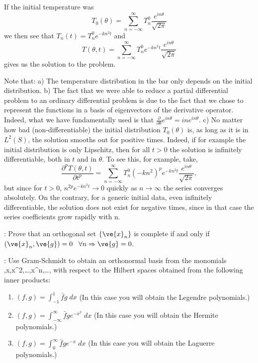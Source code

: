 If the initial temperature was 
\begin{equation}
  T_0(\theta) = \sum^{\infty}_{n=-\infty} T_n^0 \frac{e^{in\theta}}{\sqrt{2\pi}}
\end{equation}
%
we then see that $T_n(t) = T_n^0 e^{-kn^2t}$ and
\begin{equation}
  \label{eq:T_fourier_solucion}
  T(\theta,t) = \sum^{\infty}_{n=-\infty} T_n^0 e^{-kn^2t} \frac{e^{in\theta}}{\sqrt{2\pi}}
\end{equation}
%
gives us the solution to the problem.

Note that: 
a) The temperature distribution in the bar only depends on
the initial distribution. 
%
b) The fact that we were able to reduce a partial differential problem to an ordinary differential problem is due to the fact that we chose to represent the functions in a basis of eigenvectors of the derivative operator. Indeed, what
we have fundamentally used is that 
$\frac{\partial}{\partial \theta} e^{in\theta} = in e^{in\theta}$.
%
c) No matter how bad (non-differentiable) the 
initial distribution $T_0(\theta)$ is, as long as it is in $L^2(S)$, the solution smooths out for positive times. Indeed, if for example the initial distribution is only Lipschitz, then for all $t > 0$ the solution 
is infinitely differentiable, both in $t$ and in $\theta$. 
To see this, for example, take,
\begin{equation}
   \frac{\partial^pT(\theta,t)}{\partial t^p}  
   = \sum^{\infty}_{n=-\infty} T_n^0 (-kn^2)^p e^{-kn^2t} \frac{e^{in\theta}}{\sqrt{2\pi}},
\end{equation}
%
but since for $t>0$, $n^{2p} e^{-kn^2t} \to 0$ quickly as $n \to \infty$ the series converges absolutely. On the contrary, for a generic initial data, even infinitely differentiable, the solution does not exist for negative times, since in that case the series coefficients grow rapidly
with n. 


\ejer: Prove that an orthogonal set $\{\ve{x}_n\}$ is complete 
if and only if
$(\ve{x}_n,\ve{g}) =  0 \;\;\; \forall n \Rightarrow \ve{g}=0$.
\espa

\bpro:
Use Gram-Schmidt to obtain an orthonormal basis from
the monomials 
,\;x,\;x^2,\;\ldots,x^n,\ldots,
\eeq
with respect to the Hilbert spaces obtained from the following
inner products:
\begin{enumerate}
\item $(f,g) = \int^1_{-1} \bar fg \;dx$ (In this case you will obtain the
Legendre polynomials.)

\item $(f,g) = \int^{\infty}_{-\infty} \bar f g e^{-x^2} \;dx$
(In this case you will obtain the Hermite polynomials.)

\item $(f,g) = \int^{\infty}_0 \bar f g e^{-x}\; dx$
(In this case you will obtain the Laguerre polynomials.)

\end{enumerate}

